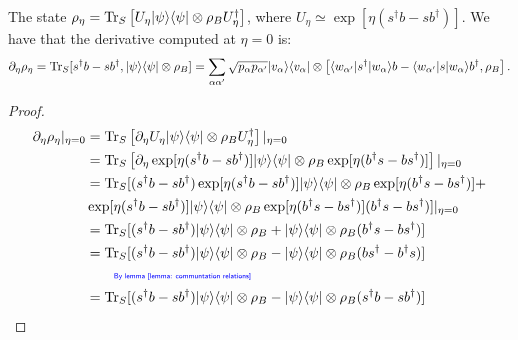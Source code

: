 \documentclass[../../note.tex]{subfiles}
\begin{document}
\begin{lemma}
    The state $\rho_{\eta} = \operatorname{Tr}_S \left[U_{\eta} \vert \psi\rangle \langle \psi \vert \otimes \rho_B U_{\eta}^{\dagger}\right]$, where $U_{\eta} \simeq \exp[\eta(s^\dagger b - s b^\dagger)]$. We have that the derivative computed at $\eta = 0$ is:
    \begin{align}
        \partial_{\eta} \rho_{\eta} = \operatorname{Tr}_S[s^\dagger b - s b^\dagger, \vert \psi \rangle \langle \psi \vert \otimes \rho_B] = \sum_{\alpha \alpha^\prime} \sqrt{p_{\alpha} p_{\alpha'}} \vert v_{\alpha} \rangle \langle v_{\alpha} \vert \otimes \left[\langle w_{\alpha'} \vert s^\dagger \vert w_{\alpha} \rangle b - \langle w_{\alpha'} \vert s \vert w_{\alpha} \rangle b^\dagger, \rho_B \right].
    \end{align}
\end{lemma}
\begin{proof}
    \begin{align}
        \partial_{\eta} \rho_{\eta} \vert_{\eta=0}
        &= \tr_S\left[\partial_{\eta} U_{\eta} \vert \psi\rangle \langle \psi \vert \otimes \rho_B U_{\eta}^{\dagger}\right] \vert_{\eta=0} \\
        &= \tr_S\left[\partial_{\eta} \exp[\eta(s^\dagger b - s b^\dagger)] \vert \psi\rangle \langle \psi \vert \otimes \rho_B \exp[\eta(b^\dagger s - b s^\dagger)] \right] \vert_{\eta=0} \\
        &= \tr_S[ (s^\dagger b - s b^\dagger)\exp[\eta(s^\dagger b - s b^\dagger)] \vert \psi\rangle \langle \psi \vert \otimes \rho_B \exp[\eta(b^\dagger s - b s^\dagger)] +  \\
        &\exp[\eta(s^\dagger b - s b^\dagger)] \vert \psi\rangle \langle \psi \vert \otimes \rho_B \exp[\eta(b^\dagger s - b s^\dagger)](b^\dagger s - b s^\dagger) ]  \vert_{\eta=0}\\
        &= \tr_S[ (s^\dagger b - s b^\dagger) \vert \psi\rangle \langle \psi \vert \otimes \rho_B + \vert \psi\rangle \langle \psi \vert \otimes \rho_B (b^\dagger s - b s^\dagger) ]\\ 
        &= \tr_S[ (s^\dagger b - s b^\dagger) \vert \psi\rangle \langle \psi \vert \otimes \rho_B - \vert \psi\rangle \langle \psi \vert \otimes \rho_B (b s^\dagger - b^\dagger s) ]\\
        &\qquad\eqnote{By lemma \ref{lemma: communtation relations}} \nonumber \\
        &= \tr_S[ (s^\dagger b - s b^\dagger) \vert \psi\rangle \langle \psi \vert \otimes \rho_B - \vert \psi\rangle \langle \psi \vert \otimes \rho_B (s^\dagger b - s b^\dagger) ]\\

\end{align}
\end{proof}
\end{document}
